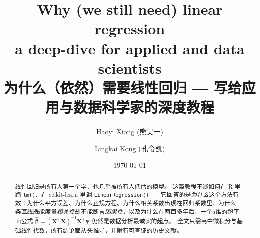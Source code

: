 \documentclass[11pt, a4paper]{ctexart}
\title{\Huge \textbf{Why (we still need) linear regression}\\[6pt]
\Large a deep-dive for applied and data scientists\\[10pt]
\large 为什么（依然）需要线性回归 --- 写给应用与数据科学家的深度教程}
\author{Haoyi Xiong (熊昊一) \and Lingkai Kong (孔令凯)}
\date{\today}
\theoremstyle{plain}
\theoremstyle{definition}
\theoremstyle{remark}
\newcommand{\X}{\mathbf{X}}
\newcommand{\y}{\mathbf{y}}
\begin{document}
\maketitle

\begin{abstract}
\noindent
线性回归是所有人第一个学、也几乎被所有人低估的模型。
这篇教程不谈如何在 R 里跑 \texttt{lm()}、在 scikit-learn 里调 \texttt{LinearRegression()}——它回答的是\textit{为什么}这个方法有效：为什么平方误差、为什么正规方程、为什么相关系数出现在回归系数里、为什么一条直线既能度量\textit{相关性}却不能断言\textit{因果性}，以及为什么在两百多年后，一个$d$维的超平面公式
$\widehat{\bm{\beta}} = (\X^\top \X)^{-1} \X^\top \y$
仍然是数据分析最诚实的起点。
全文只需高中微积分与基础线性代数，所有结论都从头推导，并附有可查证的历史文献。
\end{abstract}

\newpage
\tableofcontents
\newpage



\clearpage

\clearpage

\clearpage

\clearpage

\clearpage

\clearpage

\clearpage

\clearpage

\clearpage

\clearpage

\end{document}
